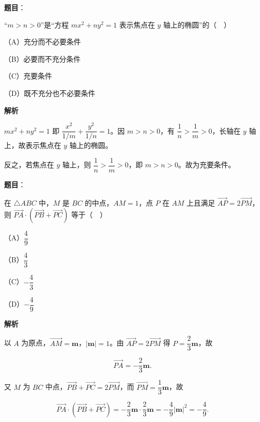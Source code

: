 \begin{answer}

\textbf{题目}：

“$m>n>0$”是“方程 $mx^2+ny^2=1$ 表示焦点在 $y$ 轴上的椭圆”的（　）

（A）充分而不必要条件

（B）必要而不充分条件

（C）充要条件

（D）既不充分也不必要条件

\textbf{解析}

$mx^2+ny^2=1$ 即 $\dfrac{x^2}{1/m}+\dfrac{y^2}{1/n}=1$。因 $m>n>0$，有 $\dfrac1n>\dfrac1m>0$，长轴在 $y$ 轴上，故表示焦点在 $y$ 轴上的椭圆。

反之，若焦点在 $y$ 轴上，则 $\dfrac1n>\dfrac1m>0$，即 $m>n>0$。故为充要条件。


\end{answer}
\begin{answer}

\textbf{题目}：

在 $\triangle ABC$ 中，$M$ 是 $BC$ 的中点，$AM=1$，点 $P$ 在 $AM$ 上且满足 $\overrightarrow{AP}=2\overrightarrow{PM}$，则 $\overrightarrow{PA}\cdot(\overrightarrow{PB}+\overrightarrow{PC})$ 等于（　）

（A）$\dfrac49$

（B）$\dfrac43$

（C）$-\dfrac43$

（D）$-\dfrac49$

\textbf{解析}

以 $A$ 为原点，$\overrightarrow{AM}=\boldsymbol m$，$|\boldsymbol m|=1$。由 $\overrightarrow{AP}=2\overrightarrow{PM}$ 得 $P=\dfrac23\boldsymbol m$，故

\nopagebreak[4]
\[\overrightarrow{PA}=-\frac23\boldsymbol m.\]

又 $M$ 为 $BC$ 中点，$\overrightarrow{PB}+\overrightarrow{PC}=2\overrightarrow{PM}$，而 $\overrightarrow{PM}=\dfrac13\boldsymbol m$，故

\nopagebreak[4]
\[\overrightarrow{PA}\cdot(\overrightarrow{PB}+\overrightarrow{PC})
=-\frac23\boldsymbol m\cdot\frac23\boldsymbol m
=-\frac49|\boldsymbol m|^2=-\frac49.\]


\end{answer}

